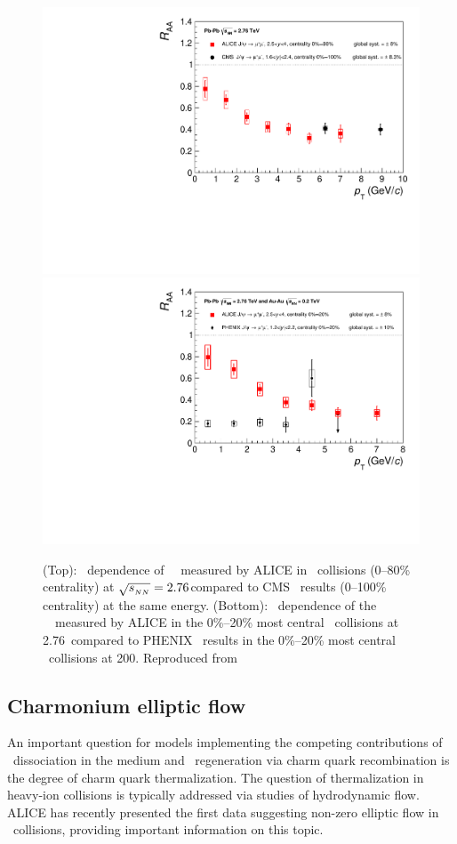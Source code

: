 \begin{figure}[h!]
\begin{center}
\includegraphics[width=0.49\linewidth,keepaspectratio]{qqbarfigures/RAAPtvsModels1.pdf}
\includegraphics[width=0.49\linewidth,keepaspectratio]{qqbarfigures/RAAPtvsModels2.pdf}
\caption{ \label{fig:GR:raaexp2}
(Top): \pT\ dependence of \jpsi\ \Raa\ measured by ALICE in \PbPb\ 
collisions (0--80\% centrality) at $\sqrt{s_{_{NN}}} = 2.76$\TeV compared to CMS~\cite{Chatrchyan:2012np} 
results (0--100\% centrality) at the same energy.
(Bottom): \pT\ dependence of the \jpsi\ \Raa\ measured by ALICE in the 0\%--20\% most 
central \PbPb\ collisions at 2.76\TeV\ compared to PHENIX~\cite{Adare:2011yf} 
results in the 0\%--20\% most central \AuAu\ collisions at 200\GeV. Reproduced from~\cite{}}
\end{center}
\end{figure}


\subsection{Charmonium elliptic flow}

An important question for models implementing the competing contributions of 
\jpsi\ dissociation in the medium and \jpsi\ regeneration via charm quark recombination is 
the degree of charm quark thermalization. The question of thermalization in heavy-ion collisions is typically addressed
via studies of hydrodynamic flow. ALICE has recently presented the first data suggesting non-zero elliptic flow
in \PbPb\ collisions, providing important information on this topic.

